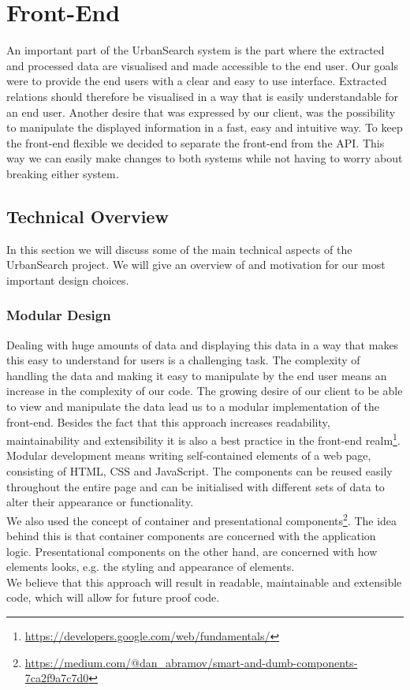 \section{Front-End}\label{sec:5-front-end}
An important part of the UrbanSearch system is the part where the extracted and processed data are visualised and made accessible to the end user. Our goals were to provide the end users with a clear and easy to use interface. Extracted relations should therefore be visualised in a way that is easily understandable for an end user. Another desire that was expressed by our client, was the possibility to manipulate the displayed information in a fast, easy and intuitive way. To keep the front-end flexible we decided to separate the front-end from the API. This way we can easily make changes to both systems while not having to worry about breaking either system.

\subsection{Technical Overview}
In this section we will discuss some of the main technical aspects of the UrbanSearch project. We will give an overview of and motivation for our most important design choices.

\subsubsection{Modular Design}
Dealing with huge amounts of data and displaying this data in a way that makes this easy to understand for users is a challenging task. The complexity of handling the data and making it easy to manipulate by the end user means an increase in the complexity of our code. The growing desire of our client to be able to view and manipulate the data lead us to a modular implementation of the front-end.
Besides the fact that this approach increases readability, maintainability and extensibility it is also a best practice in the front-end realm\footnote{\url{https://developers.google.com/web/fundamentals/}}.\\
Modular development means writing self-contained elements of a web page, consisting of HTML, CSS and JavaScript. The components can be reused easily throughout the entire page and can be initialised with different sets of data to alter their appearance or functionality.\\
We also used the concept of container and presentational components\footnote{\url{https://medium.com/@dan_abramov/smart-and-dumb-components-7ca2f9a7c7d0}}. The idea behind this is that container components are concerned with the application logic. Presentational components on the other hand, are concerned with how elements looks, e.g. the styling and appearance of elements.\\
We believe that this approach will result in readable, maintainable and extensible code, which will allow for future proof code.
